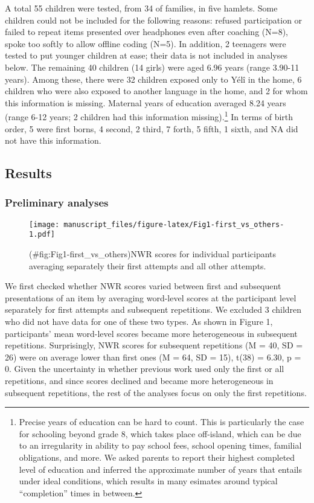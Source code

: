 \documentclass[english,,man,floatsintext]{apa6}
\begin{document}
A total 55 children were tested, from 34 of families, in five hamlets. Some children could not be included for the following reasons: refused participation or failed to repeat items presented over headphones even after coaching (N=8), spoke too softly to allow offline coding (N=5). In addition, 2 teenagers were tested to put younger children at ease; their data is not included in analyses below. The remaining 40 children (14 girls) were aged 6.96 years (range 3.90-11 years). Among these, there were 32 children exposed only to Yélî in the home, 6 children who were also exposed to another language in the home, and 2 for whom this information is missing. Maternal years of education averaged 8.24 years (range 6-12 years; 2 children had this information missing).\footnote{Precise years of education can be hard to count. This is particularly the case for schooling beyond grade 8, which takes place off-island, which can be due to an irregularity in ability to pay school fees, school opening times, familial obligations, and more. We asked parents to report their highest completed level of education and inferred the approximate number of years that entails under ideal conditions, which results in many esimates around typical ``completion'' times in between.} In terms of birth order, 5 were first borns, 4 second, 2 third, 7 forth, 5 fifth, 1 sixth, and NA did not have this information.

\hypertarget{results}{%
\subsection{Results}\label{results}}

\hypertarget{preliminary-analyses}{%
\subsubsection{Preliminary analyses}\label{preliminary-analyses}}

\begin{figure}
\centering
\texttt{[image: manuscript\_files/figure-latex/Fig1-first\_vs\_others-1.pdf]}
\caption{(\#fig:Fig1-first\_vs\_others)NWR scores for individual participants averaging separately their first attempts and all other attempts.}
\end{figure}

We first checked whether NWR scores varied between first and subsequent presentations of an item by averaging word-level scores at the participant level separately for first attempts and subsequent repetitions. We excluded 3 children who did not have data for one of these two types. As shown in Figure 1, participants' mean word-level scores became more heterogeneous in subsequent repetitions. Surprisingly, NWR scores for subsequent repetitions (M = 40, SD = 26)
were on average lower than first ones (M = 64, SD = 15), t(38) = 6.30, p = 0. Given the uncertainty in whether previous work used only the first or all repetitions, and since scores declined and became more heterogeneous in subsequent repetitions, the rest of the analyses focus on only the first repetitions.
\end{document}
